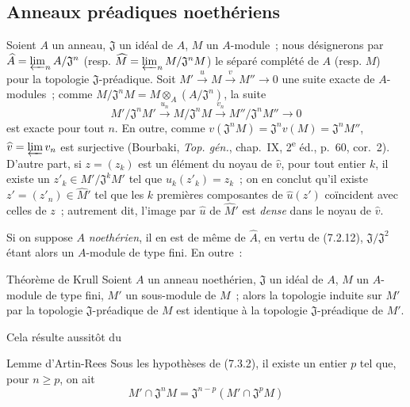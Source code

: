 \subsection{Anneaux préadiques noethériens}
\label{subsection:0.7.3-fr}

\begin{env}[7.3.1]
\label{0.7.3.1-fr}
Soient $A$ un anneau, $\mathfrak J$ un idéal de $A$, $M$ un $A$-module~;
nous désignerons par
$\widehat A=\varprojlim_n A/\mathfrak J^n$ (resp.
$\widehat M=\varprojlim_n M/\mathfrak J^nM$) le séparé complété de $A$
(resp. $M$) pour la topologie $\mathfrak J$-préadique. Soit
$M'\xrightarrow{u}M\xrightarrow{v}M''\to0$
une suite exacte de $A$-modules~; comme
$M/\mathfrak J^nM=M\otimes_A(A/\mathfrak J^n)$, la suite
\[
  M'/\mathfrak J^nM'\xrightarrow{u_n}
  M/\mathfrak J^nM\xrightarrow{v_n}
  M''/\mathfrak J^nM''\to0
\]
est exacte pour tout $n$. En outre, comme
$v(\mathfrak J^nM)=\mathfrak J^nv(M)=\mathfrak J^nM''$,
$\widehat v=\varprojlim v_n$ est surjective (Bourbaki,
\emph{Top. gén.}, chap.~IX, 2\textsuperscript{e} éd., p.~60, cor.~2).
D'autre part, si $z=(z_k)$ est un élément du noyau de $\widehat v$, pour tout
entier $k$, il existe un $z'_k\in M'/\mathfrak J^kM'$ tel que
$u_k(z'_k)=z_k$~; on en conclut qu'il existe
$z'=(z'_n)\in\widehat{M}'$ tel que les $k$ premières composantes de
$\widehat u(z')$ coïncident avec celles de $z$~; autrement dit, l'image par
$\widehat u$ de $\widehat{M}'$ est \emph{dense} dans le noyau de
$\widehat v$.

Si on suppose $A$ \emph{noethérien}, il en est de même de $\widehat A$, en
vertu de (7.2.12), $\mathfrak J/\mathfrak J^2$ étant alors un $A$-module de
type fini. En outre~:
\end{env}

\begin{namedtheorem}[7.3.2]{Théorème de Krull}
\label{0.7.3.2-fr}
Soient $A$ un anneau \textup{noethérien}, $\mathfrak J$ un idéal de $A$, $M$ un
$A$-module \textup{de type fini}, $M'$ un sous-module de $M$~; alors la topologie
induite sur $M'$ par la topologie $\mathfrak J$-préadique de $M$ est identique
à la topologie $\mathfrak J$-préadique de $M'$.
\end{namedtheorem}

Cela résulte aussitôt du

\begin{namedlemma}[7.3.2.1]{Lemme d'Artin-Rees}
\label{0.7.3.2.1-fr}
Sous les hypothèses de \textup{(7.3.2)}, il existe un entier $p$ tel que, pour
$n\geq p$, on ait
\[
  M'\cap\mathfrak J^nM=\mathfrak J^{n-p}
  (M'\cap\mathfrak J^pM)
\]
\end{namedlemma}

